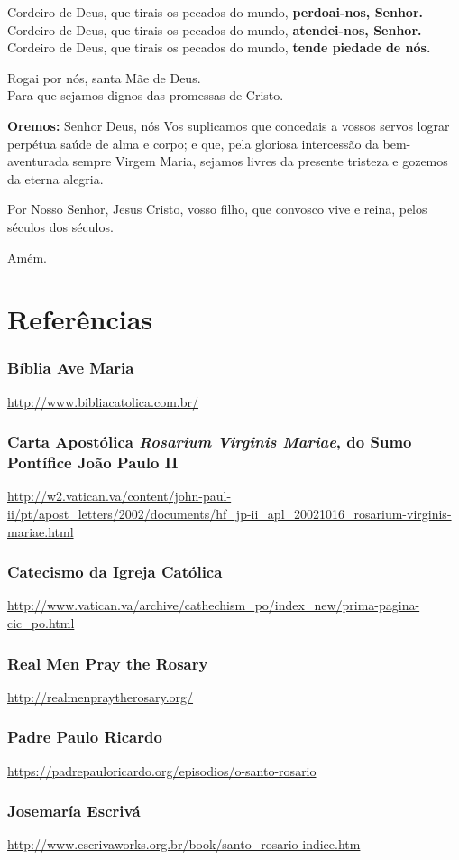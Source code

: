 \documentclass[10pt,a5paper]{book}
\newcommand{\from}[1]{\subsection*{#1}}
\begin{document}
Cordeiro de Deus, que tirais os pecados do mundo, \textbf{perdoai-nos, Senhor.} \\
Cordeiro de Deus, que tirais os pecados do mundo, \textbf{atendei-nos, Senhor.} \\
Cordeiro de Deus, que tirais os pecados do mundo, \textbf{tende piedade de nós.}

Rogai por nós, santa Mãe de Deus. \\
Para que sejamos dignos das promessas de Cristo.

\textbf{Oremos:}
Senhor Deus, nós Vos suplicamos que concedais a vossos servos lograr perpétua saúde de alma e corpo;
e que, pela gloriosa intercessão da bem-aventurada sempre Virgem Maria, sejamos livres da presente tristeza e gozemos da eterna alegria.

Por Nosso Senhor, Jesus Cristo, vosso filho, que convosco vive e reina, pelos séculos dos séculos.

Amém.


\chapter{Referências}

\from{Bíblia Ave Maria}

\url{http://www.bibliacatolica.com.br/}

\from{Carta Apostólica \emph{Rosarium Virginis Mariae}, do Sumo Pontífice João Paulo II}

\url{http://w2.vatican.va/content/john-paul-ii/pt/apost_letters/2002/documents/hf_jp-ii_apl_20021016_rosarium-virginis-mariae.html}

\from{Catecismo da Igreja Católica}

\url{http://www.vatican.va/archive/cathechism_po/index_new/prima-pagina-cic_po.html}

\from{Real Men Pray the Rosary}

\url{http://realmenpraytherosary.org/}

\from{Padre Paulo Ricardo}

\url{https://padrepauloricardo.org/episodios/o-santo-rosario}

\from{Josemaría Escrivá}

\url{http://www.escrivaworks.org.br/book/santo_rosario-indice.htm}

\end{document}
